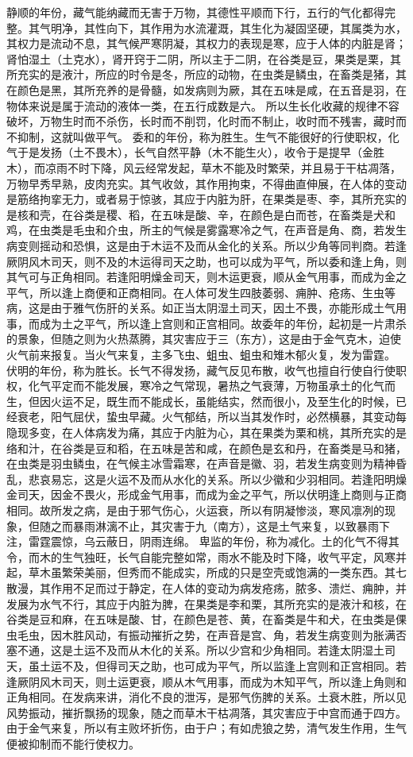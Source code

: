 \documentclass[12pt,UTF8]{ctexbook}
\begin{document}
静顺的年份，藏气能纳藏而无害于万物，其德性平顺而下行，五行的气化都得完整。其气明净，其性向下，其作用为水流灌溉，其生化为凝固坚硬，其属类为水，其权力是流动不息，其气候严寒阴凝，其权力的表现是寒，应于人体的内脏是肾；肾怕湿土（土克水），肾开窍于二阴，所以主于二阴，在谷类是豆，果类是栗，其所充实的是液汁，所应的时令是冬，所应的动物，在虫类是鳞虫，在畜类是猪，其在颜色是黑，其所充养的是骨髓，如发病则为厥，其在五味是咸，在五音是羽，在物体来说是属于流动的液体一类，在五行成数是六。
所以生长化收藏的规律不容破坏，万物生时而不杀伤，长时而不削罚，化时而不制止，收时而不残害，藏时而不抑制，这就叫做平气。
委和的年份，称为胜生。生气不能很好的行使职权，化气于是发扬（土不畏木），长气自然平静（木不能生火），收令于是提早（金胜木），而凉雨不时下降，风云经常发起，草木不能及时繁荣，并且易于干枯凋落，万物早秀早熟，皮肉充实。其气收敛，其作用拘束，不得曲直伸展，在人体的变动是筋络拘挛无力，或者易于惊骇，其应于内脏为肝，在果类是枣、李，其所充实的是核和壳，在谷类是稷、稻，在五味是酸、辛，在颜色是白而苍，在畜类是犬和鸡，在虫类是毛虫和介虫，所主的气候是雾露寒冷之气，在声音是角、商，若发生病变则摇动和恐惧，这是由于木运不及而从金化的关系。所以少角等同判商。若逢厥阴风木司天，则不及的木运得司天之助，也可以成为平气，所以委和逢上角，则其气可与正角相同。若逢阳明燥金司天，则木运更衰，顺从金气用事，而成为金之平气，所以逢上商便和正商相同。在人体可发生四肢萎弱、痈肿、疮疡、生虫等病，这是由于雅气伤肝的关系。如正当太阴湿土司天，因土不畏，亦能形成土气用事，而成为土之平气，所以逢上宫则和正宫相同。故委年的年份，起初是一片肃杀的景象，但随之则为火热蒸腾，其灾害应于三（东方），这是由于金气克木，迫使火气前来报复。当火气来复，主多飞虫、蛆虫、蛆虫和雉木郁火复，发为雷霆。
伏明的年份，称为胜长。长气不得发扬，藏气反见布散，收气也擅自行使自行使职权，化气平定而不能发展，寒冷之气常现，暑热之气衰薄，万物虽承土的化气而生，但因火运不足，既生而不能成长，虽能结实，然而很小，及至生化的时候，已经衰老，阳气屈伏，蛰虫早藏。火气郁结，所以当其发作时，必然横暴，其变动每隐现多变，在人体病发为痛，其应于内脏为心，其在果类为栗和桃，其所充实的是络和汁，在谷类是豆和稻，在五味是苦和咸，在颜色是玄和丹，在畜类是马和猪，在虫类是羽虫鳞虫，在气候主冰雪霜寒，在声音是徽、羽，若发生病变则为精神昏乱，悲哀易忘，这是火运不及而从水化的关系。所以少徽和少羽相同。若逢阳明燥金司天，因金不畏火，形成金气用事，而成为金之平气，所以伏明逢上商则与正商相同。故所发之病，是由于邪气伤心，火运衰，所以有阴凝惨淡，寒风凛冽的现象，但随之而暴雨淋漓不止，其灾害于九（南方），这是土气来复，以致暴雨下注，雷霆震惊，乌云蔽日，阴雨连绵。
卑监的年份，称为减化。土的化气不得其令，而木的生气独旺，长气自能完整如常，雨水不能及时下降，收气平定，风寒并起，草木虽繁荣美丽，但秀而不能成实，所成的只是空壳或饱满的一类东西。其七散漫，其作用不足而过于静定，在人体的变动为病发疮疡，脓多、溃烂、痈肿，并发展为水气不行，其应于内脏为脾，在果类是李和栗，其所充实的是液汁和核，在谷类是豆和麻，在五味是酸、甘，在颜色是苍、黄，在畜类是牛和犬，在虫类是倮虫毛虫，因木胜风动，有振动摧折之势，在声音是宫、角，若发生病变则为胀满否塞不通，这是土运不及而从木化的关系。所以少宫和少角相同。若逢太阴湿土司天，虽土运不及，但得司天之助，也可成为平气，所以监逢上宫则和正宫相同。若逢厥阴风木司天，则土运更衰，顺从木气用事，而成为木知平气，所以逢上角则和正角相同。在发病来讲，消化不良的泄泻，是邪气伤脾的关系。土衰木胜，所以见风势振动，摧折飘扬的现象，随之而草木干枯凋落，其灾害应于中宫而通于四方。由于金气来复，所以有主败坏折伤，由于户；有如虎狼之势，清气发生作用，生气便被抑制而不能行使权力。
\end{document}
